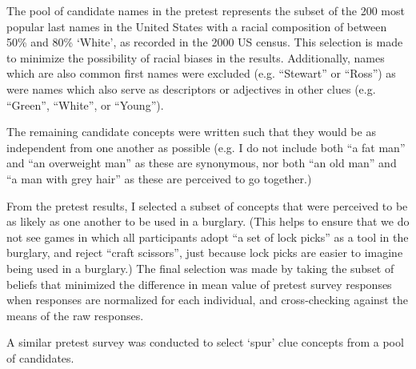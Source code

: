\documentclass{article}
\begin{document}
The pool of candidate names in the pretest represents the subset of the 200 most popular last names in the United States with a racial composition of between 50\% and 80\% ‘White’, as recorded in the 2000 US census. This selection is made to minimize the possibility of racial biases in the results. Additionally, names which are also common first names were excluded (e.g. “Stewart” or “Ross”) as were names which also serve as descriptors or adjectives in other clues (e.g. “Green”, “White”, or “Young”).

The remaining candidate concepts were written such that they would be as independent from one another as possible (e.g. I do not include both “a fat man” and “an overweight man” as these are synonymous, nor both “an old man” and “a man with grey hair” as these are perceived to go together.)

From the pretest results, I selected a subset of concepts that were perceived to be as likely as one another to be used in a burglary. (This helps to ensure that we do not see games in which all participants adopt “a set of lock picks” as a tool in the burglary, and reject “craft scissors”, just because lock picks are easier to imagine being used in a burglary.) The final selection was made by taking the subset of beliefs that minimized the difference in mean value of pretest survey responses when responses are normalized for each individual, and cross-checking against the means of the raw responses.

A similar pretest survey was conducted to select ‘spur’ clue concepts from a pool of candidates.
\end{document}
